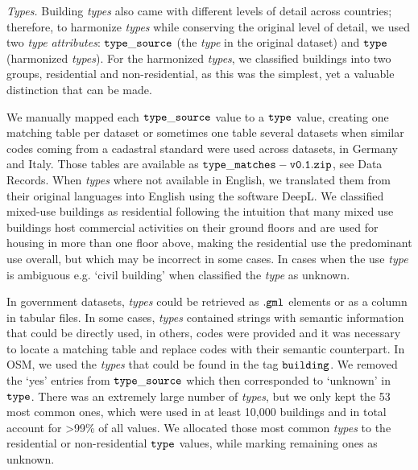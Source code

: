 \documentclass[fleqn,10pt]{wlscirep}
\begin{document}
\medskip \noindent \textit{Types.} \hspace{0.1cm} Building \textit{types} also came with different levels of detail across countries; therefore, to harmonize \textit{types} while conserving the original level of detail, we used two \textit{type} \textit{attributes}: $\tt{type\_source}$ (the \textit{type} in the original dataset) and $\tt{type}$ (harmonized \textit{types}). For the harmonized \textit{types}, we classified buildings into two groups, residential and non-residential, as this was the simplest, yet a valuable distinction that can be made. 

We manually mapped each $\tt{type\_source}$ value to a $\tt{type}$ value, creating one matching table per dataset or sometimes one table several datasets when similar codes coming from a cadastral standard were used across datasets, in Germany and Italy. Those tables are available as ${\tt type\_matches-v0.1.zip}$, see Data Records. When \textit{types} where not available in English, we translated them from their original languages into English using the software DeepL. We classified mixed-use buildings as residential following the intuition that many mixed use buildings host commercial activities on their ground floors and are used for housing in more than one floor above, making the residential use the predominant use overall, but which may be incorrect in some cases. In cases when the use \textit{type} is ambiguous e.g. `civil building' when classified the \textit{type} as unknown.

In government datasets, \textit{types} could be retrieved as $\tt{.gml}$ elements or as a column in tabular files. In some cases, \textit{types} contained strings with semantic information that could be directly used, in others, codes were provided and it was necessary to locate a matching table and replace codes with their semantic counterpart. In OSM, we used the \textit{types} that could be found in the tag $\tt{building}$. We removed the `yes' entries from $\tt{type\_source}$ which then corresponded to `unknown' in $\tt{type}$. There was an extremely large number of \textit{types}, but we only kept the 53 most common ones, which were used in at least 10,000 buildings and in total account for >99\% of all values. We allocated those most common \textit{types} to the residential or non-residential $\tt{type}$ values, while marking remaining ones as unknown.
\end{document}
